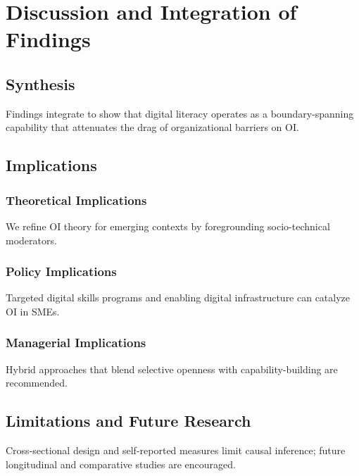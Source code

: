 \chapter{Discussion and Integration of Findings}\label{ch:discussion}

\section{Synthesis}
Findings integrate to show that digital literacy operates as a boundary-spanning capability that attenuates the drag of organizational barriers on OI.

\section{Implications}
\subsection{Theoretical Implications}
We refine OI theory for emerging contexts by foregrounding socio-technical moderators.

\subsection{Policy Implications}
Targeted digital skills programs and enabling digital infrastructure can catalyze OI in SMEs.

\subsection{Managerial Implications}
Hybrid approaches that blend selective openness with capability-building are recommended.

\section{Limitations and Future Research}
Cross-sectional design and self-reported measures limit causal inference; future longitudinal and comparative studies are encouraged.
